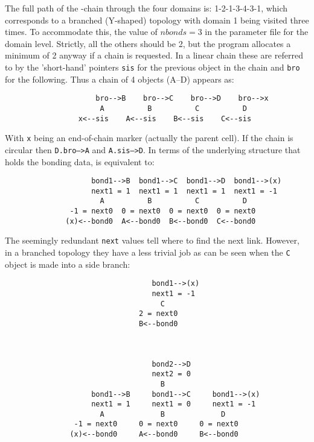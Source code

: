 The full path of the \CA-chain through the four domains is: 1-2-1-3-4-3-1, which corresponds to a
branched (Y-shaped) topology with domain 1 being visited three times.  To accommodate this, the
value of $nbonds = 3$ in the parameter file for the domain level.   Strictly, all the others should
be 2, but the program allocates a minimum of 2 anyway if a chain is requested.   In a linear chain 
these are referred to by the 'short-hand' pointers {\tt sis} for the previous object in the chain
and {\tt bro} for the following.   Thus a chain of 4 objects (A--D) appears as:
\begin{singlespace}
\begin{verbatim}
                     bro-->B    bro-->C    bro-->D    bro-->x
                      A          B          C          D
                 x<--sis    A<--sis    B<--sis    C<--sis
\end{verbatim}
\end{singlespace}
With {\tt x} being an end-of-chain marker (actually the parent cell).  If the chain is
circular then {\tt D.bro-->A} and {\tt A.sis-->D}.
In terms of the underlying structure that holds the bonding data, is equivalent to:
\begin{singlespace}
\begin{verbatim}
                    bond1-->B  bond1-->C  bond1-->D  bond1-->(x)
                    next1 = 1  next1 = 1  next1 = 1  next1 = -1
                      A          B          C          D
               -1 = next0  0 = next0  0 = next0  0 = next0
              (x)<--bond0  A<--bond0  B<--bond0  C<--bond0
\end{verbatim}
\end{singlespace}
The seemingly redundant {\tt next} values tell where to find the next link.
However, in a branched topology they have a less trivial job as can be seen when the {\tt C}
object is made into a side branch:
\begin{singlespace}
\begin{verbatim}
                                  bond1-->(x)
                                  next1 = -1
                                    C      
                               2 = next0 
                               B<--bond0    
                                                 
                                                 
                                                 
                                  bond2-->D      
                                  next2 = 0      
                                    B            
                    bond1-->B     bond1-->C     bond1-->(x)
                    next1 = 1     next1 = 0     next1 = -1
                      A             B             D    
                -1 = next0     0 = next0     0 = next0
               (x)<--bond0     A<--bond0     B<--bond0
\end{verbatim}
\end{singlespace}

